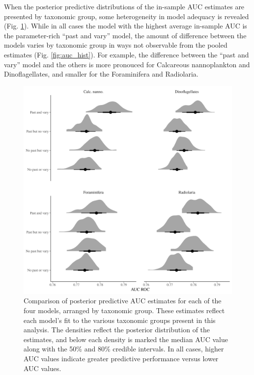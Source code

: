 \documentclass[12pt,letterpaper]{article}
\begin{document}
When the posterior predictive distributions of the in-sample AUC estimates are presented by taxonomic group, some heterogeneity in model adequacy is revealed (Fig. \ref{fig:auc_taxon}). While in all cases the model with the highest average in-sample AUC is the parameter-rich ``past and vary'' model, the amount of difference between the models varies by taxonomic group in ways not observable from the pooled estimates (Fig. \ref{fig:auc_hist}). For example, the difference between the ``past and vary'' model and the others is more pronouced for Calcareous nannoplankton and Dinoflagellates, and smaller for the Foraminifera and Radiolaria. 
\begin{figure}[ht]
  \centering
  \includegraphics[width=\textwidth,height=0.5\textheight,keepaspectratio=true]{../results/figure/auc_taxon}
  \caption{Comparison of posterior predictive AUC estimates for each of the four models, arranged by taxonomic group. These estimates reflect each model's fit to the various taxonomic groups present in this analysis. The densities reflect the posterior distribution of the estimates, and below each density is marked the median AUC value along with the 50\% and 80\% credible intervals. In all cases, higher AUC values indicate greater predictive performance versus lower AUC values.}
  \label{fig:auc_taxon}
\end{figure}
\end{document}
